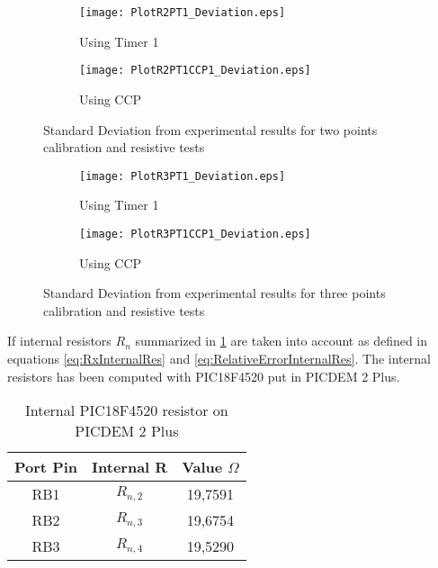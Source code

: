 \begin{figure}[H]
\centering
	\begin{subfigure}{0.75\textwidth}
	\texttt{[image: PlotR2PT1\_Deviation.eps]}
	\caption{Using Timer 1}
	\label{fig:PlotR2PT1Deviation}
	\end{subfigure}
	\begin{subfigure}{0.75\textwidth}
	\texttt{[image: PlotR2PT1CCP1\_Deviation.eps]}
	\caption{Using CCP}
	\label{fig:PlotR2PT1CCP1Deviation}
	\end{subfigure}
\caption{Standard Deviation from experimental results for two points calibration and resistive tests}
\label{fig:DeviationResistive2P}
\end{figure}

\begin{figure}[H]
\centering
    \begin{subfigure}{0.75\textwidth}
	\texttt{[image: PlotR3PT1\_Deviation.eps]}
	\caption{Using Timer 1}
	\label{fig:PlotR3PT1Deviation}
	\end{subfigure}
	\begin{subfigure}{0.75\textwidth}
	\texttt{[image: PlotR3PT1CCP1\_Deviation.eps]}
	\caption{Using CCP}
	\label{fig:PlotR3PT1CCP1Deviation}
	\end{subfigure}
\caption{Standard Deviation from experimental results for three points calibration and resistive tests}
\label{fig:DeviationResistive3P}
\end{figure}

If internal resistors $R_{n}$ summarized in \ref{tab:InternalResistors} are taken into account as defined in equations \eqref{eq:RxInternalRes} and \eqref{eq:RelativeErrorInternalRes}. The internal resistors has been computed with PIC18F4520 put in PICDEM 2 Plus.
\medskip

\begin{table}[H]
\centering
\begin{tabular}{|c|c|c|}
\hline 
Port Pin & Internal R & Value $\Omega$ \\ 
\hline 
RB1 & $R_{n,2}$ & 19,7591 \\ 
\hline 
RB2 & $R_{n,3}$ & 19,6754 \\ 
\hline 
RB3 & $R_{n,4}$ & 19,5290 \\ 
\hline 
\end{tabular} 
\caption{Internal PIC18F4520 resistor on PICDEM 2 Plus}
\label{tab:InternalResistors}
\end{table}


